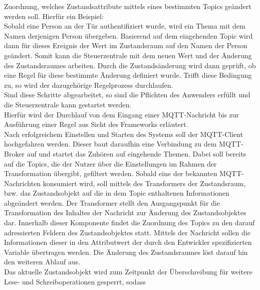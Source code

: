         Zuordnung, welches Zustandsattribute mittels eines bestimmten Topics geändert werden soll. Hierfür ein Beispiel:  
        \\
        \linebreak
        Sobald eine Person an der Tür authentifiziert wurde, wird ein Thema mit dem Namen derjenigen Person übergeben. Basierend auf 
        dem eingehenden Topic wird dann für dieses Ereignis der Wert im Zustandsraum auf den Namen der Person geändert. Somit kann 
        die Steuerzentrale mit dem neuen Wert und der Änderung des Zustandsraumes arbeiten. Durch die Zustandsänderung wird dann 
        geprüft, ob eine Regel für diese bestimmte Änderung definiert wurde. Trifft diese Bedingung zu, so wird der dazugehörige Regelprozess 
        durchlaufen.  
        \\
        \linebreak
        Sind diese Schritte abgearbeitet, so sind die Pflichten des Anwenders erfüllt und die Steuerzentrale kann gestartet werden. 
        \\
        Hierfür wird der Durchlauf von dem Eingang einer \acs{MQTT}-Nachricht bis zur Ausführung einer Regel aus Sicht des Frameworks 
        erläutert.
        \\
        \linebreak
        Nach erfolgreichem Einstellen und Starten des Systems soll der \acs{MQTT}-Client hochgefahren werden. Dieser baut daraufhin eine 
        Verbindung zu dem \acs{MQTT}-Broker auf und startet das Zuhören auf eingehende Themen. Dabei soll bereits auf die Topics,  
        die der Nutzer über die Einstellungen im Rahmen der Transformation übergibt, gefiltert werden. Sobald eine der bekannten 
        \acs{MQTT}-Nachrichten konsumiert wird, soll mittels des Transformers der Zustandsraum, bzw. das Zustandsobjekt 
        auf die in dem Topic enthaltenen Informationen abgeändert werden. Der Transformer stellt den Ausgangspunkt für die Transformation 
        des Inhaltes der Nachricht zur Änderung des Zustandsobjektes dar. Innerhalb dieser Komponente findet die Zuordnung 
        des Topics zu den darauf adressierten Feldern des Zustandsobjektes statt. Mittels der Nachricht sollen die Informationen dieser 
        in den Attributwert der durch den Entwickler spezifizierten Variable übertragen werden. Die Änderung des 
        Zustandsraumes löst darauf hin den weiteren Ablauf aus. 
        \\
        Das aktuelle Zustandsobjekt wird zum Zeitpunkt der Überschreibung für weitere Lese- und Schreiboperationen gesperrt, sodass 
